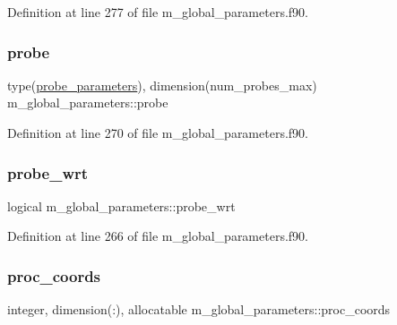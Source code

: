 Definition at line 277 of file m\+\_\+global\+\_\+parameters.\+f90.

\mbox{\label{namespacem__global__parameters_a028c7e09aaa23dc9ee8844febffed3af}} 
\subsubsection{\texorpdfstring{probe}{probe}}
{\footnotesize\ttfamily type(\hyperlink{structm__derived__types_1_1probe__parameters}{probe\+\_\+parameters}), dimension(num\+\_\+probes\+\_\+max) m\+\_\+global\+\_\+parameters\+::probe}



Definition at line 270 of file m\+\_\+global\+\_\+parameters.\+f90.

\mbox{\label{namespacem__global__parameters_a2de4a56202a6e2f47ce657fcda4ecdb4}} 
\subsubsection{\texorpdfstring{probe\+\_\+wrt}{probe\_wrt}}
{\footnotesize\ttfamily logical m\+\_\+global\+\_\+parameters\+::probe\+\_\+wrt}



Definition at line 266 of file m\+\_\+global\+\_\+parameters.\+f90.

\mbox{\label{namespacem__global__parameters_a48dea2bc17c5e4465a444c926070ae9b}} 
\subsubsection{\texorpdfstring{proc\+\_\+coords}{proc\_coords}}
{\footnotesize\ttfamily integer, dimension(\+:), allocatable m\+\_\+global\+\_\+parameters\+::proc\+\_\+coords}




